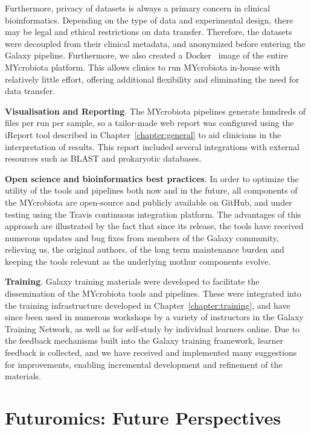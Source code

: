 Furthermore, privacy of datasets is always a primary concern in clinical bioinformatics. Depending on the type of data and experimental design, there may be legal and ethical restrictions on data transfer. Therefore, the datasets were decoupled from their clinical metadata, and anonymized before entering the Galaxy pipeline. Furthermore, we also created a Docker~\cite{url-docker} image of the entire MYcrobiota platform. This allows clinics to run MYcrobiota in-house with relatively little effort, offering additional flexibility and eliminating the need for data transfer.

\textbf{Visualisation and Reporting}. The MYcrobiota pipelines generate hundreds of files per run per sample, so a tailor-made web report was configured using the iReport tool described in Chapter~\ref{chapter:general} to aid clinicians in the interpretation of results. This report included several integrations with external resources such as BLAST and prokaryotic databases.

\textbf{Open science and bioinformatics best practices}. In order to optimize the utility of the tools and pipelines both now and in the future, all components of the MYcrobiota are open-source and publicly available on GitHub, and under testing using the Travis continuous integration platform. The advantages of this approach are illustrated by the fact that since its release, the tools have received numerous updates and bug fixes from members of the Galaxy community, relieving us, the original authors, of the long term maintenance burden and keeping the tools relevant as the underlying mothur components evolve.

\textbf{Training}. Galaxy training materials were developed to facilitate the dissemination of the MYcrobiota tools and pipelines. These were integrated into the training infrastructure developed in Chapter~\ref{chapter:training}, and have since been used in numerous workshops by a variety of instructors in the Galaxy Training Network, as well as for self-study by individual learners online. Due to the feedback mechanisms built into the Galaxy training framework, learner feedback is collected, and we have received and implemented many suggestions for improvements, enabling incremental development and refinement of the materials.


\section{Futuromics: Future Perspectives}

